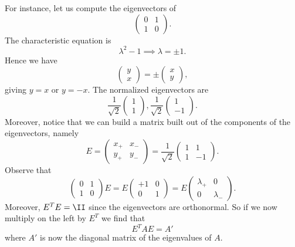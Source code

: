For instance, let us compute the eigenvectors of
\begin{equation}
    \begin{pmatrix}
        0 & 1 \\ 1 & 0
    \end{pmatrix}.
\end{equation}
The characteristic equation is
\begin{equation}
    \lambda^2-1 \implies \lambda = \pm 1.
\end{equation}
Hence we have 
\begin{equation}
    \begin{pmatrix}
        y\\ x
    \end{pmatrix}
    = \pm \begin{pmatrix}
        x\\y
    \end{pmatrix},
\end{equation}
giving $y=x$ or $y=-x$. The normalized eigenvectors are
\begin{equation}
    \frac{1}{\sqrt{2}}\begin{pmatrix}
    1\\1
    \end{pmatrix},
    \frac{1}{\sqrt{2}}\begin{pmatrix}
    1\\-1
    \end{pmatrix}.
\end{equation}
Moreover, notice that we can build a matrix built out of the components of the eigenvectors, namely
\begin{equation}
    E=
    \begin{pmatrix}
        x_+ & x_-\\
        y_+ & y_-
    \end{pmatrix}
    =\frac{1}{\sqrt{2}}\begin{pmatrix}
        1 & 1\\
        1 & -1
    \end{pmatrix}.
\end{equation}
Observe that
\begin{equation}
    \begin{pmatrix}
        0 & 1\\
        1 & 0
    \end{pmatrix}
    E = E\begin{pmatrix}
        +1 & 0\\
        0 & 1
    \end{pmatrix} =E\begin{pmatrix}
        \lambda_+ & 0\\
        0 & \lambda_-
    \end{pmatrix}.
\end{equation}
Moreover, $E^TE=\II$ since the eigenvectors are orthonormal. So if we now multiply on the left by $E^T$ we find that
\begin{equation}
    E^T A E= A'
\end{equation}
where $A'$ is now the diagonal matrix of the eigenvalues of $A$.
